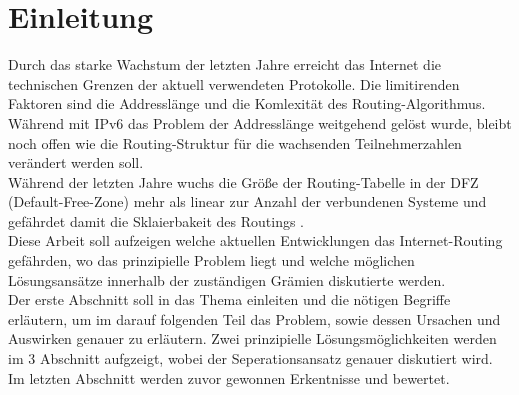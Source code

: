 \section{Einleitung}
Durch das starke Wachstum der letzten Jahre erreicht das Internet die technischen Grenzen der aktuell verwendeten Protokolle. Die limitirenden Faktoren sind die Addresslänge und die Komlexität des Routing-Algorithmus. Während mit IPv6 das Problem der Addresslänge weitgehend gelöst wurde, bleibt noch offen wie die Routing-Struktur für die wachsenden Teilnehmerzahlen verändert werden soll. \\

Während der letzten Jahre wuchs die Größe der Routing-Tabelle in der DFZ (Default-Free-Zone) mehr als linear zur Anzahl der verbundenen Systeme und gefährdet damit die Sklaierbakeit des Routings \cite{Huston:2003:BGP}. \\

Diese Arbeit soll aufzeigen welche aktuellen Entwicklungen das Internet-Routing gefährden, wo das prinzipielle Problem liegt und welche möglichen Lösungsansätze innerhalb der zuständigen Grämien diskutierte werden. \\

Der erste Abschnitt soll in das Thema einleiten und die nötigen Begriffe erläutern, um im darauf folgenden Teil das Problem, sowie dessen Ursachen und Auswirken genauer zu erläutern. Zwei prinzipielle Lösungsmöglichkeiten werden im 3 Abschnitt aufgzeigt, wobei der Seperationsansatz genauer diskutiert wird. Im letzten Abschnitt werden zuvor gewonnen Erkentnisse und bewertet.

 

